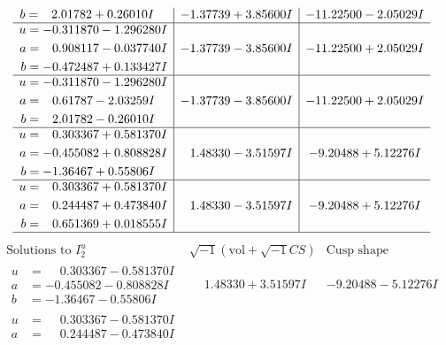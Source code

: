 \documentclass[1p]{elsarticle_modified}
\theoremstyle{definition}
\newcommand{\I}{\sqrt{-1}}
\begin{document}
$$\begin{array}{c|c|c}
\begin{aligned}
b &= \phantom{-}2.01782 + 0.26010 I\end{aligned}
 & -1.37739 + 3.85600 I & -11.22500 - 2.05029 I \\ \hline\begin{aligned}
u &= -0.311870 - 1.296280 I \\
a &= \phantom{-}0.908117 - 0.037740 I \\
b &= -0.472487 + 0.133427 I\end{aligned}
 & -1.37739 - 3.85600 I & -11.22500 + 2.05029 I \\ \hline\begin{aligned}
u &= -0.311870 - 1.296280 I \\
a &= \phantom{-}0.61787 - 2.03259 I \\
b &= \phantom{-}2.01782 - 0.26010 I\end{aligned}
 & -1.37739 - 3.85600 I & -11.22500 + 2.05029 I \\ \hline\begin{aligned}
u &= \phantom{-}0.303367 + 0.581370 I \\
a &= -0.455082 + 0.808828 I \\
b &= -1.36467 + 0.55806 I\end{aligned}
 & \phantom{-}1.48330 - 3.51597 I & -9.20488 + 5.12276 I \\ \hline\begin{aligned}
u &= \phantom{-}0.303367 + 0.581370 I \\
a &= \phantom{-}0.244487 + 0.473840 I \\
b &= \phantom{-}0.651369 + 0.018555 I\end{aligned}
 & \phantom{-}1.48330 - 3.51597 I & -9.20488 + 5.12276 I\\
 \hline 
 \end{array}$$\newpage$$\begin{array}{c|c|c}  
\text{Solutions to }I^u_{2}& \I (\text{vol} + \sqrt{-1}CS) & \text{Cusp shape}\\
 \hline 
\begin{aligned}
u &= \phantom{-}0.303367 - 0.581370 I \\
a &= -0.455082 - 0.808828 I \\
b &= -1.36467 - 0.55806 I\end{aligned}
 & \phantom{-}1.48330 + 3.51597 I & -9.20488 - 5.12276 I \\ \hline\begin{aligned}
u &= \phantom{-}0.303367 - 0.581370 I \\
a &= \phantom{-}0.244487 - 0.473840 I \\

\end{aligned}
\end{array}$$
\end{document}
